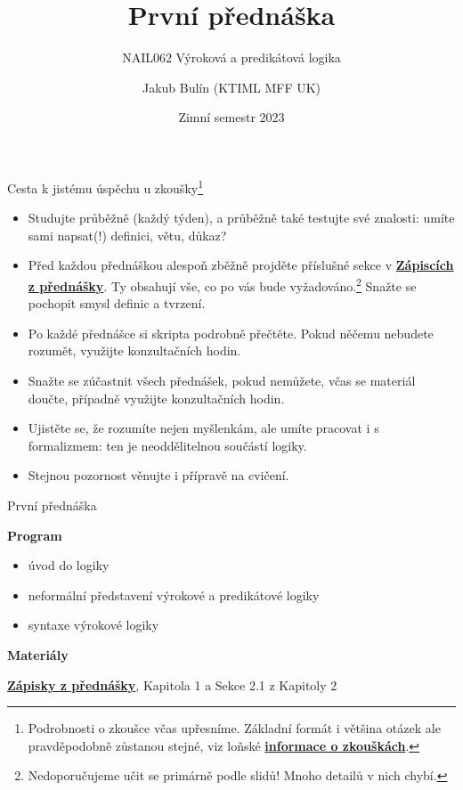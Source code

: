\documentclass{beamer}
\title{První přednáška}
\subtitle{NAIL062 Výroková a predikátová logika}
\author{Jakub Bulín (KTIML MFF UK)}
\date{Zimní semestr 2023}
\begin{document}
\frame{\titlepage}


\begin{frame}{Cesta k jistému úspěchu u zkoušky\footnote{Podrobnosti o zkoušce včas upřesníme. Základní formát i většina otázek ale pravděpodobně zůstanou stejné, viz loňské \href{https://jbulin.github.io/teaching/fall/nail062/files/info-o-zkouskach.pdf}{\alert{\textbf{informace o zkouškách}}}.}}

\begin{itemize}    
    \item Studujte \alert{průběžně (každý týden)}, a průběžně také \alert{testujte své znalosti}: umíte sami \alert{napsat}(!) definici, větu, důkaz?
    \item Před každou přednáškou alespoň zběžně projděte příslušné sekce v \href{https://github.com/jbulin-mff-uk/nail062/raw/main/lecture/lecture-notes/lecture-notes.pdf}{\alert{\textbf{Zápiscích z přednášky}}}. Ty obsahují vše, co po vás bude vyžadováno.\footnote{Nedoporučujeme učit se primárně podle slidů! Mnoho detailů v nich chybí.} Snažte se pochopit smysl definic a tvrzení.
    \item Po každé přednášce si skripta \alert{podrobně přečtěte}. Pokud něčemu nebudete rozumět, využijte konzultačních hodin.
    \item Snažte se zúčastnit všech přednášek, pokud nemůžete, včas se materiál doučte, případně využijte konzultačních hodin.
    \item Ujistěte se, že rozumíte nejen myšlenkám, ale umíte pracovat i s \alert{formalizmem}: ten je neoddělitelnou součástí logiky.
    \item Stejnou pozornost věnujte i přípravě na \alert{cvičení}.
    \bigskip
\end{itemize}

\end{frame}


\begin{frame}{První přednáška}

    \textbf{Program}
        \begin{itemize}
            \item úvod do logiky
            \item neformální představení výrokové a predikátové logiky
            \item syntaxe výrokové logiky
        \end{itemize}        


    \textbf{Materiály}

        \href{https://github.com/jbulin-mff-uk/nail062/raw/main/lecture/lecture-notes/lecture-notes.pdf}{\alert{\textbf{Zápisky z přednášky}}}, Kapitola 1 a Sekce 2.1 z Kapitoly 2


\end{frame}
\end{document}
